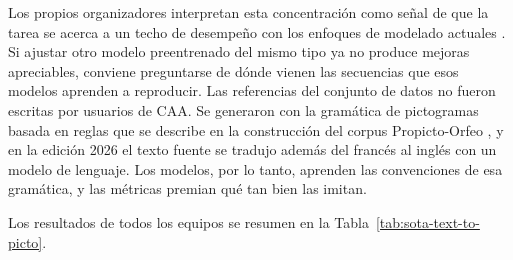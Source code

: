 Los propios organizadores interpretan esta concentración como señal de que la tarea se acerca a un techo de desempeño con los enfoques de modelado actuales \cite{Hjuler2026}. Si ajustar otro modelo preentrenado del mismo tipo ya no produce mejoras apreciables, conviene preguntarse de dónde vienen las secuencias que esos modelos aprenden a reproducir. Las referencias del conjunto de datos no fueron escritas por usuarios de CAA. Se generaron con la gramática de pictogramas basada en reglas que se describe en la construcción del corpus Propicto-Orfeo \cite{macaire2024}, y en la edición 2026 el texto fuente se tradujo además del francés al inglés con un modelo de lenguaje. Los modelos, por lo tanto, aprenden las convenciones de esa gramática, y las métricas premian qué tan bien las imitan.

Los resultados de todos los equipos se resumen en la Tabla~\ref{tab:sota-text-to-picto}.

